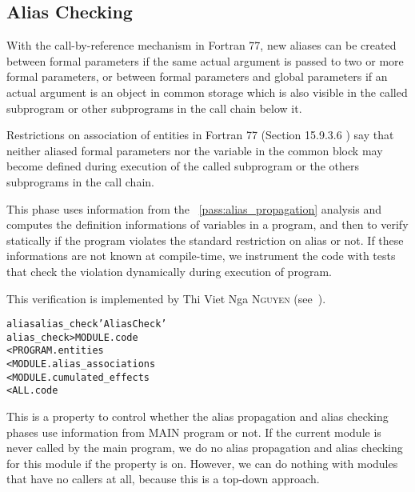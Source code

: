 \documentclass[a4paper]{report}
\newenvironment{PipsMake}{\begin{alltt}}{\end{alltt}}
\newcommand{\PipsPassRef}[1]{\texttt{\detokenize{#1}}~\ref{pass:#1}}
\newenvironment{PipsPass}[1]{\label{pass:#1}}{}
\begin{document}
\subsection{Alias Checking}
\label{subsubsection-alias-check}

\begin{PipsPass}{alias_check}

With the call-by-reference mechanism in Fortran 77, new aliases can be
created between formal parameters if the
same actual argument is passed to two or more formal parameters, or between formal
parameters and global parameters if an actual
argument is an object in common storage which is also visible in the
called subprogram or other subprograms in the call chain below it.

Restrictions on association of entities in Fortran 77 (Section 15.9.3.6
\cite{ANSI78}) say that neither aliased formal parameters nor the variable in the
common block may become defined during execution
of the called subprogram or the others subprograms in the call chain.

This phase uses information from the \PipsPassRef{alias_propagation}
analysis and computes the definition
informations of variables in a program, and then to verify
statically if the program violates the standard restriction on alias or
not. If these informations are not known at compile-time, we instrument
the code with tests that check the violation dynamically during
execution of program.

This verification is implemented by Thi Viet Nga \textsc{Nguyen} (see~\cite{Ngu02}).
\end{PipsPass}


\begin{PipsMake}
alias alias_check 'Alias Check'
alias_check   > MODULE.code
        < PROGRAM.entities
        < MODULE.alias_associations
        < MODULE.cumulated_effects
        < ALL.code
\end{PipsMake}

This is a property to control whether the alias propagation and alias checking
phases use information from MAIN program or not. If the current
module is never called by the main program, we do no alias propagation
and alias checking for this module if the property is on. However, we
can do nothing with modules that have no callers at all, because this
is a top-down approach.
\end{document}
